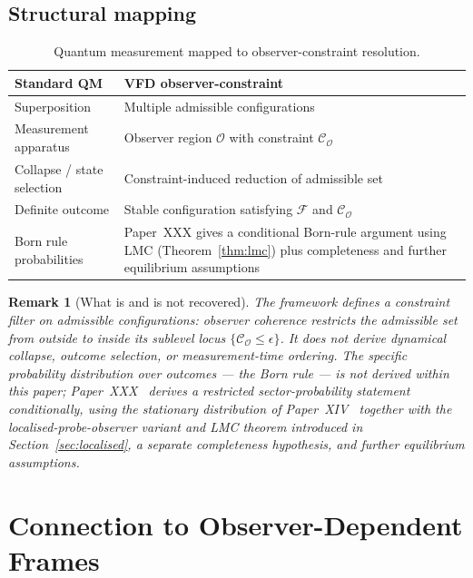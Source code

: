 \documentclass[12pt]{article}
\newtheorem{remark}[theorem]{Remark}
\newcommand{\Fcal}{\mathcal{F}}
\newcommand{\Ocal}{\mathcal{O}}
\newcommand{\Ccal}{\mathcal{C}}
\begin{document}
\subsection{Structural mapping}

\begin{table}[ht]
\centering
\caption{Quantum measurement mapped to observer-constraint resolution.}
\label{tab:qm}
\begin{tabular}{@{}ll@{}}
\toprule
Standard QM & VFD observer-constraint \\
\midrule
Superposition & Multiple admissible configurations \\
Measurement apparatus & Observer region $\Ocal$ with constraint $\Ccal_\Ocal$ \\
Collapse / state selection & Constraint-induced reduction of admissible set \\
Definite outcome & Stable configuration satisfying $\Fcal$ and $\Ccal_\Ocal$ \\
Born rule probabilities & Paper~XXX gives a conditional Born-rule argument using LMC (Theorem~\ref{thm:lmc}) plus completeness and further equilibrium assumptions \\
\bottomrule
\end{tabular}
\end{table}

\begin{remark}[What is and is not recovered]
The framework \emph{defines a constraint filter} on admissible configurations: observer coherence restricts the admissible set from outside to inside its sublevel locus $\{\Ccal_\Ocal \leq \epsilon\}$. It does not derive dynamical collapse, outcome selection, or measurement-time ordering. The specific probability distribution over outcomes --- the Born rule --- is not derived within this paper; Paper~XXX~\citep{SmartXXX} derives a restricted sector-probability statement conditionally, using the stationary distribution of Paper~XIV~\citep{SmartXIV} together with the localised-probe-observer variant and LMC theorem introduced in Section~\ref{sec:localised}, a separate completeness hypothesis, and further equilibrium assumptions.
\end{remark}

\section{Connection to Observer-Dependent Frames}\label{sec:relativistic}
\end{document}
